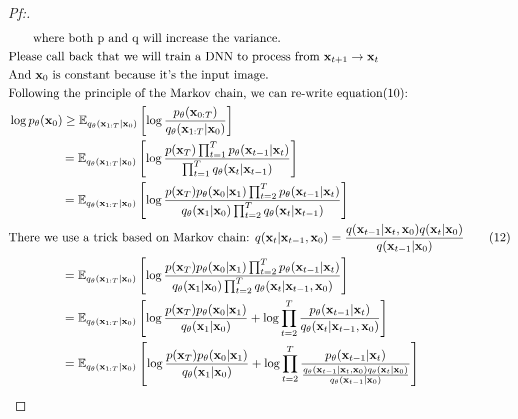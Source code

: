 \documentclass{article}
\begin{document}
\begin{proof}[\textit{Pf:}]
\begin{align}
        &\qquad\text{where both p and q will increase the variance.} \notag \\
        &\text{Please call back that we will train a DNN to process from } \mathbf{x}_{t+1} \to \mathbf{x}_{t} \notag \\
        &\text{And } \mathbf{x}_0 \text{ is constant because it's the input image.} \notag \\
        &\text{Following the principle of the Markov chain, we can re-write equation(10):} \notag \\
        &\log p_{\theta}(\mathbf{x}_0) \geq \mathbb{E}_{q_{\theta}(\mathbf{x}_{1:T} |\mathbf{x}_0)}\left[ \log \frac{p_{\theta}(\mathbf{x}_{0:T})}{q_{\theta}(\mathbf{x}_{1:T}|\mathbf{x}_0)}\right] \notag \\
        &\qquad\qquad\,\, = \mathbb{E}_{q_{\theta}(\mathbf{x}_{1:T}|\mathbf{x}_0)}\left[\log \frac{p(\mathbf{x}_T) \prod_{t=1}^{T}p_{\theta}(\mathbf{x}_{t-1}|\mathbf{x}_t)}{\prod_{t=1}^{T} q_{\theta}(\mathbf{x}_{t}|\mathbf{x}_{t-1})} \right] \notag \\
        &\qquad\qquad\,\, = \mathbb{E}_{q_{\theta}(\mathbf{x}_{1:T}|\mathbf{x}_0)}\left[\log \frac{p(\mathbf{x}_T)p_{\theta}(\mathbf{x}_0|\mathbf{x}_1) \prod_{t=2}^{T}p_{\theta}(\mathbf{x}_{t-1}|\mathbf{x}_t)}{q_{\theta}(\mathbf{x}_{1}|\mathbf{x}_{0})\prod_{t=2}^{T} q_{\theta}(\mathbf{x}_t|\mathbf{x}_{t-1})} \right] \notag \\
        &\text{There we use a trick based on Markov chain: } q(\mathbf{x}_t | \mathbf{x}_{t-1}, \mathbf{x}_0) = \frac{q(\mathbf{x}_{t-1} | \mathbf{x}_{t}, \mathbf{x}_0)q(\mathbf{x}_{t}|\mathbf{x}_0)}{q(\mathbf{x}_{t-1}|\mathbf{x}_0)} \tag{12} \\
        &\qquad\qquad\,\, = \mathbb{E}_{q_{\theta}(\mathbf{x}_{1:T}|\mathbf{x}_0)}\left[\log \frac{p(\mathbf{x}_T)p_{\theta}(\mathbf{x}_0|\mathbf{x}_1) \prod_{t=2}^{T}p_{\theta}(\mathbf{x}_{t-1}|\mathbf{x}_t)}{q_{\theta}(\mathbf{x}_{1}|\mathbf{x}_{0})\prod_{t=2}^{T} q_{\theta}(\mathbf{x}_t|\mathbf{x}_{t-1}, \mathbf{x}_0)} \right] \notag \\
        &\qquad\qquad\,\, = \mathbb{E}_{q_{\theta}(\mathbf{x}_{1:T}|\mathbf{x}_0)}\left[\log \frac{p(\mathbf{x}_T)p_{\theta}(\mathbf{x}_0|\mathbf{x}_1)}{q_{\theta}(\mathbf{x}_{1}|\mathbf{x}_{0})} + \log \prod_{t=2}^{T} \frac{p_{\theta}(\mathbf{x}_{t-1}|\mathbf{x}_t)}{q_{\theta}(\mathbf{x}_t|\mathbf{x}_{t-1}, \mathbf{x}_0)} \right] \notag \\
        &\qquad\qquad\,\, = \mathbb{E}_{q_{\theta}(\mathbf{x}_{1:T}|\mathbf{x}_0)}\left[\log \frac{p(\mathbf{x}_T)p_{\theta}(\mathbf{x}_0|\mathbf{x}_1)}{q_{\theta}(\mathbf{x}_{1}|\mathbf{x}_{0})} + \log \prod_{t=2}^{T} \frac{p_{\theta}(\mathbf{x}_{t-1}|\mathbf{x}_t)}{\frac{q_{\theta}(\mathbf{x}_{t-1}|\mathbf{x}_t, \mathbf{x}_0)q_{\theta}(\mathbf{x}_t | \mathbf{x}_0)}{q_{\theta}(\mathbf{x}_{t-1} | \mathbf{x}_0)}} \right] \notag \\

\end{align}
\end{proof}
\end{document}
